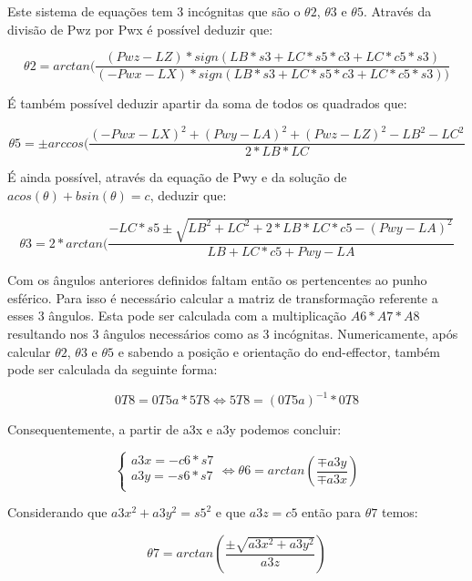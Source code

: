 \documentclass{report}
\begin{document}
Este sistema de equações tem 3 incógnitas que são o $\theta 2$, $\theta 3$ e $\theta 5$. Através da divisão de Pwz por Pwx é possível deduzir que:

\begin{equation}
    \theta 2 = arctan(\frac{(Pwz-LZ)*sign(LB*s3 + LC*s5*c3 + LC*c5*s3)}{(-Pwx-LX)*sign(LB*s3 + LC*s5*c3 + LC*c5*s3))}
\end{equation}

É também possível deduzir apartir da soma de todos os quadrados que:

\begin{equation}
    \theta 5 = \pm arccos(\frac{(-Pwx-LX)^2+(Pwy-LA)^2+(Pwz-LZ)^2-LB^2-LC^2}{2*LB*LC}
\end{equation}

É ainda possível, através da equação de Pwy e da solução de $acos(\theta)+bsin(\theta)=c$, deduzir que:

\begin{equation}
    \theta 3 = 2*arctan(\frac{-LC*s5\pm \sqrt{LB^2+LC^2+2*LB*LC*c5-(Pwy-LA)^2}}{LB+LC*c5+Pwy-LA}
\end{equation}

Com os ângulos anteriores definidos faltam então os pertencentes ao punho esférico. Para isso é necessário calcular a matriz de transformação referente a esses 3 ângulos. Esta pode ser calculada com a multiplicação $A6*A7*A8$ resultando nos 3 ângulos necessários como as 3 incógnitas. Numericamente, após calcular $\theta 2$, $\theta 3$ e $\theta 5$ e sabendo a posição e orientação do end-effector, também pode ser calculada da seguinte forma:

\begin{equation}
    0T8 = 0T5a * 5T8 \Leftrightarrow 5T8 = (0T5a)^{-1}
    * 0T8
\end{equation}

Consequentemente, a partir de a3x e a3y podemos concluir:

\begin{equation}
    \begin{cases}
      a3x = -c6*s7\\
      a3y = -s6*s7\\
     \end{cases} \Leftrightarrow \theta 6 = arctan(\frac{\mp a3y}{\mp a3x})
\end{equation}

Considerando que $a3x^2 + a3y^2 = s5^2$ e que $a3z=c5$ então para $\theta 7$ temos:

\begin{equation}
    \theta 7 = arctan(\frac{\pm \sqrt{a3x^2 + a3y^2}}{a3z})
\end{equation}
\end{document}
